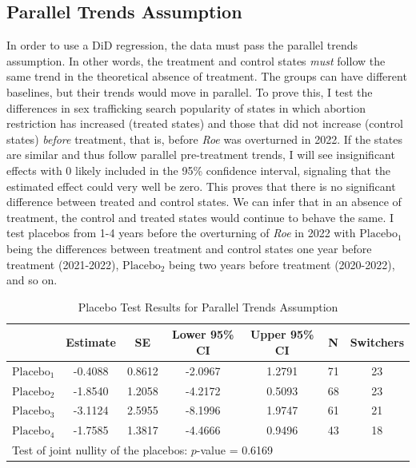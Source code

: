 \subsection{Parallel Trends Assumption}
In order to use a DiD regression, the data must pass the parallel trends assumption. In other words, the treatment and control states \textit{must} follow the same trend in the theoretical absence of treatment. The groups can have different baselines, but their trends would move in parallel. To prove this, I test the differences in sex trafficking search popularity of states in which abortion restriction has increased (treated states) and those that did not increase (control states) \textit{before} treatment, that is, before \textit{Roe} was overturned in 2022. If the states are similar and thus follow parallel pre-treatment trends, I will see insignificant effects with 0 likely included in the 95\% confidence interval, signaling that the estimated effect could very well be zero. This proves that there is no significant difference between treated and control states. We can infer that in an absence of treatment, the control and treated states would continue to behave the same. I test placebos from 1-4 years before the overturning of \textit{Roe} in 2022 with $\text{Placebo}_1$ being the differences between treatment and control states one year before treatment (2021-2022), $\text{Placebo}_2$ being two years before treatment (2020-2022), and so on. \\
\begin{table}[H]
\centering
\begin{tabular}{lcccccc}

 & Estimate & SE & Lower 95\% CI & Upper 95\% CI & N & Switchers \\
\midrule
$\text{Placebo}_1$ & -0.4088 & 0.8612 & -2.0967 & 1.2791 & 71 & 23 \\
$\text{Placebo}_2$ & -1.8540 & 1.2058 & -4.2172 & 0.5093 & 68 & 23 \\
$\text{Placebo}_3$ & -3.1124 & 2.5955 & -8.1996 & 1.9747 & 61 & 21 \\
$\text{Placebo}_4$ & -1.7585 & 1.3817 & -4.4666 & 0.9496 & 43 & 18 \\
\midrule
\multicolumn{7}{l}{\footnotesize Test of joint nullity of the placebos: $p$-value = 0.6169} \\
\bottomrule
\end{tabular}
\caption{Placebo Test Results for Parallel Trends Assumption}
\end{table}
\vspace{1em}

